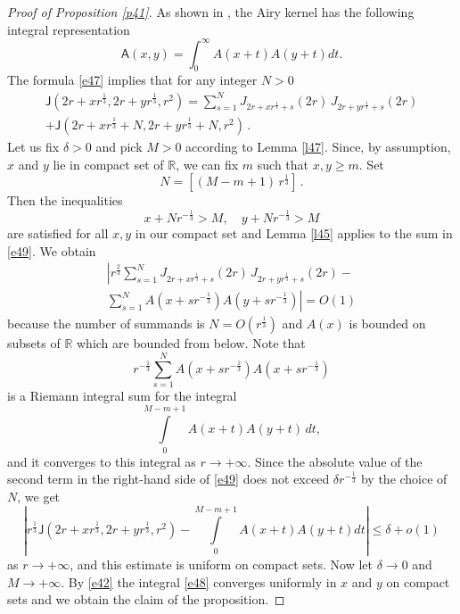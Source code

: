 \documentclass[12pt]{amsart}
\newcommand{\A}{\mathsf{A}}
\newcommand{\J}{\mathsf{J}}
\newcommand{\R}{\mathbb{R}}
\theoremstyle{plain}
\theoremstyle{definition}
\numberwithin{equation}{section}
\begin{document}
\begin{proof}[Proof of Proposition \ref{p41}] 
As shown in \cite{CL,TW}, the Airy kernel has the following integral 
representation
%
\begin{equation}\label{e48}
\A(x,y)=\int_{0}^\infty A(x+t)A(y+t)dt.
\end{equation}
%
The formula \eqref{e47} implies that
for any integer $N>0$
%
\begin{multline}\label{e49}
\J\left(2r+xr^{\frac 13},2r+yr^{\frac 13},{r^2} \right)=
\sum_{s=1}^N J_{2r+xr^{\frac 13}+s}(2r)\,J_{2r+yr^{\frac 13}+s}(2r)\\ 
+\J\left(2r+xr^{\frac 13}+N,2r+yr^{\frac 13}+N,{r^2} \right)\,.
\end{multline}
%
Let us fix $\delta>0$ and pick $M>0$ according to Lemma \ref{l47}.  Since, by assumption,
$x$ and $y$ lie in compact set of $\R$, we can fix $m$ such that
$x,y \ge m$. Set
$$
N=[(M-m+1)\, r^\frac13] \,.
$$
Then the inequalities 
%
\begin{equation*}
x+Nr^{-\frac 13}>M,\quad y+Nr^{-\frac 13}>M
\end{equation*}
%
are satisfied for all $x,y$ in our compact set and  Lemma \ref{l45} applies to
the sum in \eqref{e49}. We obtain 
%
\begin{multline*}
\left|r^{\frac 23}\sum_{s=1}^{N} J_{2r+xr^{\frac 13}+s}(2r)\,J_{2r+yr^{\frac 
13}+s}(2r)-\right.\\
\left. \sum_{s=1}^{N}
A(x+sr^{-\frac 13})A(y+sr^{-\frac 13})\right|=O(1)
\end{multline*}
%
because  the number of summands is $N=O(r^{\frac 13})$ and $A(x)$ is bounded on 
subsets of $\R$ which are bounded from below.
Note that 
%
\begin{equation*}
r^{-\frac 13} \sum_{s=1}^{N}
A(x+sr^{-\frac 13})A(x+sr^{-\frac 13})
\end{equation*}
%
is a Riemann integral  sum for the integral
%
\begin{equation*}
\int\limits_{0}^{M-m+1} A(x+t)A(y+t)\,dt,
\end{equation*}
%
and it converges to this integral as $r\to+\infty$. Since the absolute value of 
the second term in the right-hand side  of \eqref{e49}  does not exceed $\delta r^{-\frac 13}$ by 
the choice of $N$, we get
%
\begin{equation*}
\left|r^{\frac 13}\J\left(2r+xr^{\frac 13},2r+yr^{\frac 13},{r^2} 
\right)-\int\limits_{0}^{M-m+1} A(x+t)A(y+t)dt\right|\le \delta+o(1)
\end{equation*}
%
as $r\to+\infty$, and this estimate is uniform on compact sets. Now let  $\delta\to 
0$ and  $M\to+\infty$. By \eqref{e42} the
integral \eqref{e48} converges uniformly in $x$ and $y$  on compact sets and 
we obtain the claim of the proposition. 
\end{proof}
\end{document}
